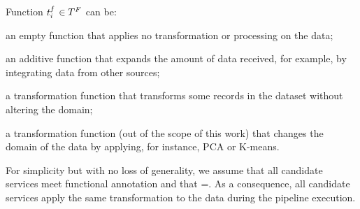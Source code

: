 Function $t^f_{i}$$\in$$T^F_{}$ can be:
\begin{enumerate*}[label=\textit{\roman*})]
  \item an empty function \tf{\epsilon} that applies no transformation or processing on the data;
  \item an additive function  that expands the amount of data received, for example, by integrating data from other sources;
  \item a transformation function  that transforms some records in the dataset without altering the domain;
  \item a transformation function  (out of the scope of this work) that changes the domain of the data by applying, for instance, PCA or K-means.
\end{enumerate*}

For simplicity but with no loss of generality, we assume that all candidate services meet functional annotation \F{} and that \TF{}=\tf{}. As a consequence, all candidate services apply the same transformation to the data during the pipeline execution.